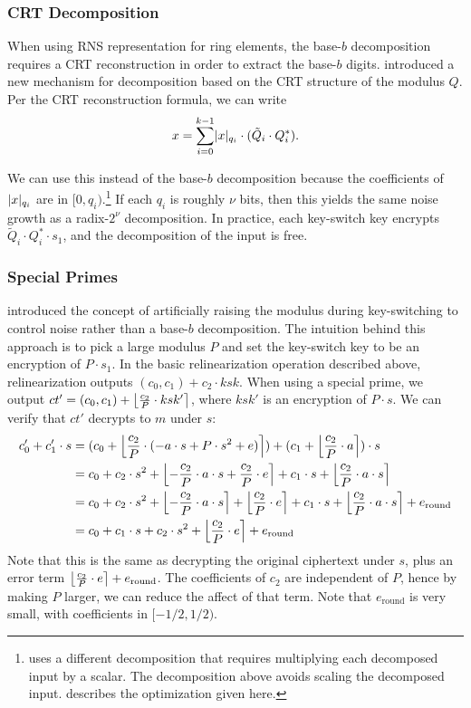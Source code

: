 \documentclass[../keyswitching.tex]{subfiles}
\begin{document}
\subsubsection{CRT Decomposition}
When using RNS representation for ring elements, the base-$b$ decomposition requires a CRT reconstruction in order to extract the base-$b$ digits. \cite{cryptoeprint:2016/510} introduced a new mechanism for decomposition based on the CRT structure of the modulus $Q$. Per the CRT reconstruction formula, we can write
\[x = \sum_{i=0}^{k-1}\abs{x}_{q_i}\cdot (\tilde{Q}_i\cdot Q_i^*).\]

We can use this instead of the base-$b$ decomposition because the coefficients of $\abs{x}_{q_i}$ are in $[0, q_i)$.\footnote{\cite{cryptoeprint:2019/688} uses a different decomposition that requires multiplying each decomposed input by a scalar. The decomposition above avoids scaling the decomposed input. \cite{cryptoeprint:2020/1203} describes the optimization given here.} If each $q_i$ is roughly $\nu$ bits, then this yields the same noise growth as a radix-$2^\nu$ decomposition. In practice, each key-switch key encrypts $\tilde{Q}_i\cdot Q_i^*\cdot s_1$, and the decomposition of the input is free.

\subsubsection{Special Primes}
\label{sec:ks-special-modulus}
\cite{cryptoeprint:2012/099} introduced the concept of artificially raising the modulus during key-switching to control noise rather than a base-$b$ decomposition. The intuition behind this approach is to pick a large modulus $P$ and set the key-switch key to be an encryption of $P\cdot s_1$. In the basic relinearization operation described above, relinearization outputs $(c_0, c_1) + c_2\cdot ksk$. When using a special prime, we output $ct' = (c_0, c_1) + \round*{\frac{c_2}{P}\cdot ksk'}$, where $ksk'$ is an encryption of $P\cdot s$. We can verify that $ct'$ decrypts to $m$ under $s$:
\begin{align*}
	c_0' + c_1'\cdot s &= (c_0 + \round*{\frac{c_2}{P}\cdot(-a\cdot s + P\cdot s^2 + e)}) + (c_1 + \round*{\frac{c_2}{P}\cdot a})\cdot s \\
	&= c_0 + c_2\cdot s^2 + \round*{-\frac{c_2}{P}\cdot a\cdot s + \frac{c_2}{P}\cdot e} + c_1\cdot s + \round*{\frac{c_2}{P}\cdot a\cdot s} \\
	&= c_0 + c_2\cdot s^2 + \round*{-\frac{c_2}{P}\cdot a\cdot s} + \round*{\frac{c_2}{P}\cdot e} + c_1\cdot s + \round*{\frac{c_2}{P}\cdot a\cdot s} + e_\mathrm{round} \\
	&= c_0 + c_1\cdot s + c_2\cdot s^2 + \round*{\frac{c_2}{P}\cdot e} + e_\mathrm{round}
\end{align*}
Note that this is the same as decrypting the original ciphertext under $s$, plus an error term $\round*{\frac{c_2}{P}\cdot e} + e_\mathrm{round}$. The coefficients of $c_2$ are independent of $P$, hence by making $P$ larger, we can reduce the affect of that term. Note that $e_\mathrm{round}$ is very small, with coefficients in $[-1/2, 1/2)$. 
\end{document}
